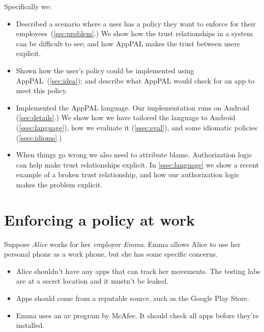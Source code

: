 \documentclass[twoside,letterpaper]{soups}
\begin{document}
Specifically we:
\begin{itemize}
  \item
    Described a scenario where a user has a policy they want to enforce for their employees~(\autoref{sec:problem}.)
    We show how the trust relationships in a system can be difficult to see;
      and how AppPAL makes the trust between users explicit.
  \item
    Shown how the user's policy could be implemented using AppPAL~(\autoref{sec:idea});
      and describe what AppPAL would check for an app to meet this policy.

  \item Implemented the AppPAL language.
    Our implementation runs on Android (\autoref{sec:details}.)
    We show how we have tailored the language to Android (\autoref{ssec:language}),
      how we evaluate it (\autoref{ssec:eval}),
      and some idiomatic policies (\autoref{ssec:idioms}.)

  \item When things go wrong we also need to attribute blame.
    Authorization logic can help make trust relationships explicit.
    In \autoref{ssec:language} we show a recent example of a broken trust relationship,
    and how our authorization logic makes the problem explicit.

\end{itemize}

\section{Enforcing a policy at work}
\label{sec:problem}

Suppose \emph{Alice} works for her \emph{em\/}ployer \emph{Emma}.
Emma allows Alice to use her personal phone as a work phone, but she has some specific concerns.
\begin{itemize}
  \item Alice shouldn't have any apps that can track her movements.
    The testing labs are at a secret location and it mustn't be leaked.
  \item Apps should come from a reputable source, such as the Google Play Store.
  \item Emma uses an \ac{av} program by McAfee.
    It should check all apps before they're installed.
\end{itemize}
\end{document}
